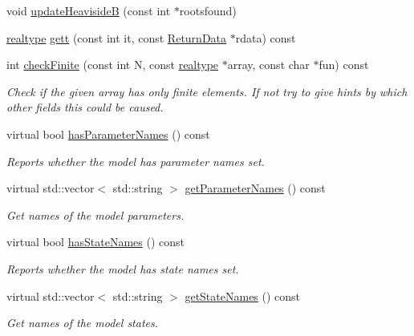 \begin{DoxyCompactItemize}
\item 
void \mbox{\hyperlink{classamici_1_1_model_a430edd546832d0abbea6472eb7e43da8}{update\+HeavisideB}} (const int $\ast$rootsfound)
\item 
\mbox{\hyperlink{namespaceamici_a1bdce28051d6a53868f7ccbf5f2c14a3}{realtype}} \mbox{\hyperlink{classamici_1_1_model_a09e0a747a99fb59657e71690ce69726b}{gett}} (const int it, const \mbox{\hyperlink{classamici_1_1_return_data}{Return\+Data}} $\ast$rdata) const
\item 
int \mbox{\hyperlink{classamici_1_1_model_a4c38f5beea9e36aa20a089307edb5fed}{check\+Finite}} (const int N, const \mbox{\hyperlink{namespaceamici_a1bdce28051d6a53868f7ccbf5f2c14a3}{realtype}} $\ast$array, const char $\ast$fun) const
\begin{DoxyCompactList}\small\item\em Check if the given array has only finite elements. If not try to give hints by which other fields this could be caused. \end{DoxyCompactList}\item 
virtual bool \mbox{\hyperlink{classamici_1_1_model_a7b51ed26a01b793c832fe680d9543763}{has\+Parameter\+Names}} () const
\begin{DoxyCompactList}\small\item\em Reports whether the model has parameter names set. \end{DoxyCompactList}\item 
virtual std\+::vector$<$ std\+::string $>$ \mbox{\hyperlink{classamici_1_1_model_aa99eb9052c2bbddc98547a0ad9a3c7bf}{get\+Parameter\+Names}} () const
\begin{DoxyCompactList}\small\item\em Get names of the model parameters. \end{DoxyCompactList}\item 
virtual bool \mbox{\hyperlink{classamici_1_1_model_ae851580412b6a85e8cc4183715e428f6}{has\+State\+Names}} () const
\begin{DoxyCompactList}\small\item\em Reports whether the model has state names set. \end{DoxyCompactList}\item 
virtual std\+::vector$<$ std\+::string $>$ \mbox{\hyperlink{classamici_1_1_model_af0a035784f9fbea688512f2c7f211b92}{get\+State\+Names}} () const
\begin{DoxyCompactList}\small\item\em Get names of the model states. \end{DoxyCompactList}\item 

\end{DoxyCompactItemize}
